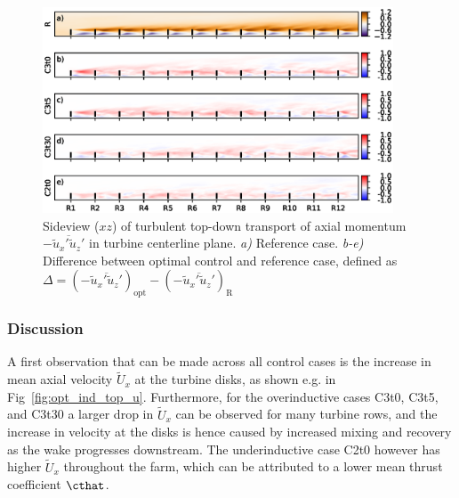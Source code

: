 	\begin{figure}[bt]
		\centering
		\includegraphics[width=0.93\textwidth]{chapters/optimal_induction_control/sideview_uw.eps}
		\caption[Sideview ($xz$) of turbulent top-down transport of axial momentum $- \overline{\widetilde{u}_x'\widetilde{u}_z'}$ in turbine centerline plane.]{Sideview ($xz$) of turbulent top-down transport of axial momentum $- \overline{\widetilde{u}_x'\widetilde{u}_z'}$ in turbine centerline plane. \emph{a) } Reference case. \emph{b-e)} Difference between optimal control and reference case, defined as $\Delta = (- \overline{\widetilde{u}_x'\widetilde{u}_z'})_{\text{opt}} - (- \overline{\widetilde{u}_x'\widetilde{u}_z'})_{\text{R}}$  \label{fig:opt_ind_side_uw}}
	\end{figure}	

	\subsubsection{Discussion}
	 A first observation that can be made across all control cases is the increase in mean axial velocity $\widetilde{U}_x$ at the turbine disks, as shown e.g. in Fig~\ref{fig:opt_ind_top_u}. Furthermore, for the overinductive cases C3t0, C3t5, and C3t30 a larger drop in $\widetilde{U}_x$ can be observed for many turbine rows, and the increase in velocity at the disks is hence caused by increased mixing and recovery as the wake progresses downstream. The underinductive case C2t0 however has higher $\widetilde{U}_x$ throughout the farm, which can be attributed to a lower mean thrust coefficient $\cthat$. 
	 
